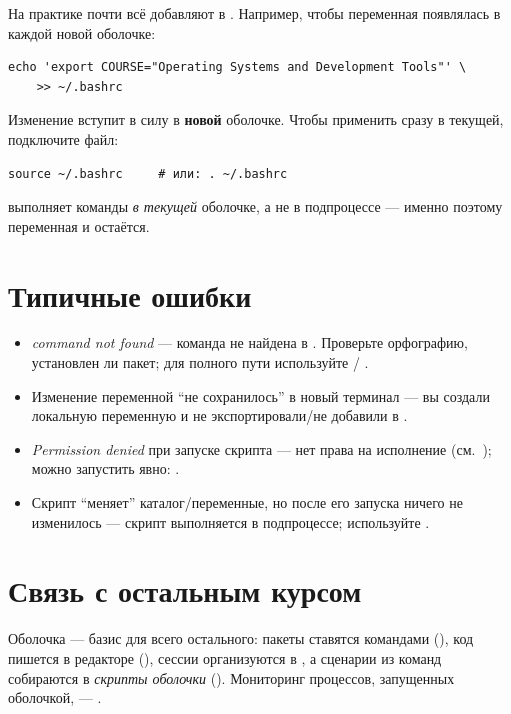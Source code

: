 На практике почти всё добавляют в .
Например, чтобы переменная появлялась в каждой новой оболочке:
\begin{verbatim}
echo 'export COURSE="Operating Systems and Development Tools"' \
    >> ~/.bashrc
\end{verbatim}

Изменение вступит в силу в \textbf{новой} оболочке. Чтобы применить
сразу в текущей, подключите файл:
\begin{verbatim}
source ~/.bashrc     # или: . ~/.bashrc
\end{verbatim}

 выполняет команды \emph{в текущей} оболочке,
а не в подпроцессе --- именно поэтому переменная и остаётся.

\section{Типичные ошибки}
\begin{itemize}
  \item \emph{command not found} --- команда не найдена в .
    Проверьте орфографию, установлен ли пакет; для полного пути
    используйте  / .
  \item Изменение переменной ``не сохранилось'' в новый терминал ---
    вы создали локальную переменную и не экспортировали/не
    добавили в .
  \item \emph{Permission denied} при запуске скрипта --- нет права
    на исполнение (см.\ \nameref{ch:05-permissions});
    можно запустить явно: .
  \item Скрипт ``меняет'' каталог/переменные, но после его запуска
    ничего не изменилось --- скрипт выполняется в подпроцессе;
    используйте .
\end{itemize}

\section{Связь с остальным курсом}
Оболочка --- базис для всего остального: пакеты ставятся
командами (), код пишется в редакторе
(), сессии организуются в ,
а сценарии из команд собираются в
\emph{скрипты оболочки} ().
Мониторинг процессов, запущенных оболочкой, ---
.

